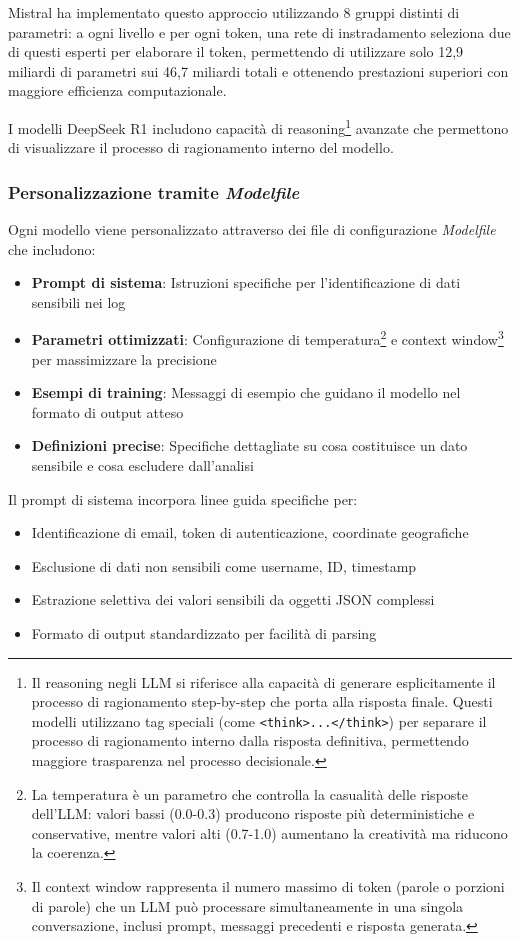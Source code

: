 \documentclass[12pt]{report}
\begin{document}
Mistral ha implementato questo approccio utilizzando 8 gruppi distinti di parametri: a ogni livello e per ogni token, una rete di instradamento seleziona due di questi esperti per elaborare il token, permettendo di utilizzare solo 12,9 miliardi di parametri sui 46,7 miliardi totali e ottenendo prestazioni superiori con maggiore efficienza computazionale.~\cite{mistral_moe}

I modelli DeepSeek R1 includono capacità di reasoning\footnote{Il reasoning negli LLM si riferisce alla capacità di generare esplicitamente il processo di ragionamento step-by-step che porta alla risposta finale. Questi modelli utilizzano tag speciali (come \texttt{<think>...</think>}) per separare il processo di ragionamento interno dalla risposta definitiva, permettendo maggiore trasparenza nel processo decisionale.} avanzate che permettono di visualizzare il processo di ragionamento interno del modello.

\subsubsection{Personalizzazione tramite \textit{Modelfile}}
Ogni modello viene personalizzato attraverso dei file di configurazione \textit{Modelfile} che includono:

\begin{itemize}
    \item \textbf{Prompt di sistema}: Istruzioni specifiche per l'identificazione di dati sensibili nei log
    \item \textbf{Parametri ottimizzati}: Configurazione di temperatura\footnote{La temperatura è un parametro che controlla la casualità delle risposte dell'LLM: valori bassi (0.0-0.3) producono risposte più deterministiche e conservative, mentre valori alti (0.7-1.0) aumentano la creatività ma riducono la coerenza.} e context window\footnote{Il context window rappresenta il numero massimo di token (parole o porzioni di parole) che un LLM può processare simultaneamente in una singola conversazione, inclusi prompt, messaggi precedenti e risposta generata.} per massimizzare la precisione
    \item \textbf{Esempi di training}: Messaggi di esempio che guidano il modello nel formato di output atteso
    \item \textbf{Definizioni precise}: Specifiche dettagliate su cosa costituisce un dato sensibile e cosa escludere dall'analisi
\end{itemize}

Il prompt di sistema incorpora linee guida specifiche per:
\begin{itemize}
    \item Identificazione di email, token di autenticazione, coordinate geografiche
    \item Esclusione di dati non sensibili come username, ID, timestamp
    \item Estrazione selettiva dei valori sensibili da oggetti JSON complessi
    \item Formato di output standardizzato per facilità di parsing
\end{itemize}
\end{document}
